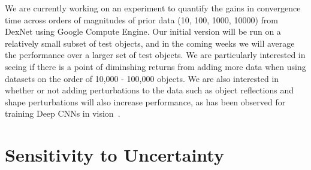 We are currently working on an experiment to quantify the gains in convergence time across orders of magnitudes of prior data (10, 100, 1000, 10000) from DexNet using Google Compute Engine.
Our initial version will be run on a relatively small subset of test objects, and in the coming weeks we will average the performance over a larger set of test objects.
We are particularly interested in seeing if there is a point of diminshing returns from adding more data when using datasets on the order of 10,000 - 100,000 objects.
We are also interested in whether or not adding perturbations to the data such as object reflections and shape perturbations will also increase performance, as has been observed for training Deep CNNs in vision~\cite{krizhevsky2012imagenet}.

\section{Sensitivity to Uncertainty}